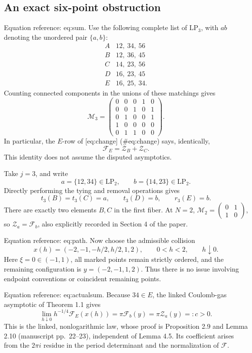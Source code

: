 \documentclass[10pt]{article}
\begin{document}
\subsection*{An exact six-point obstruction}
Equation reference: eq:sum. Use the following complete list of \(\mathrm{LP}_3\), with \(ab\) denoting the unordered pair \(\{a,b\}\): \[\begin{array}{c|l}
 A&12,\ 34,\ 56\\
 B&12,\ 36,\ 45\\
 C&14,\ 23,\ 56\\
 D&16,\ 23,\ 45\\
 E&16,\ 25,\ 34 .
\end{array}\] Counting connected components in the unions of these matchings gives \[\mathcal M_3=
 \begin{pmatrix}
 0&0&0&1&0\\
 0&0&1&0&1\\
 0&1&0&0&1\\
 1&0&0&0&0\\
 0&1&1&0&0
 \end{pmatrix}.\] In particular, the \(E\)-row of [eq:change] (\#eq:change) says, identically, \[
 \mathcal F_E=\mathcal Z_B+\mathcal Z_C.\] This identity does not assume the disputed asymptotics.\par
Take \(j=3\), and write \[a=\{12,34\}\in\mathrm{LP}_2,\qquad b=\{14,23\}\in\mathrm{LP}_2.\] Directly performing the tying and removal operations gives \[t_3(B)=t_3(C)=a,\qquad t_3(D)=b,\qquad r_3(E)=b .\] There are exactly two elements \(B,C\) in the first fiber. At \(N=2\), \(\mathcal M_2=\left(\begin{smallmatrix}0&1\\1&0\end{smallmatrix}\right)\), so \(\mathcal Z_a=\mathcal F_b\), also explicitly recorded in Section 4 of the paper.\par
Equation reference: eq:path. Now choose the admissible collision \[
 x(h)=(-2,-1,-h/2,h/2,1,2),\qquad 0<h<2,\qquad h\downarrow0.\] Here \(\xi=0\in(-1,1)\), all marked points remain strictly ordered, and the remaining configuration is \(y=(-2,-1,1,2)\). Thus there is no issue involving endpoint conventions or coincident remaining points.\par
Equation reference: eq:actualsum. Because \(34\in E\), the linked Coulomb-gas asymptotic of Theorem 1.1 gives \[
 \lim_{h\downarrow0}h^{-1/4}\mathcal F_E(x(h))
   =\pi\mathcal F_b(y)=\pi\mathcal Z_a(y)=:c>0.\] This is the linked, nonlogarithmic law, whose proof is Proposition 2.9 and Lemma 2.10 (manuscript pp. 22–23), independent of Lemma 4.5. Its coefficient arises from the \(2\pi i\) residue in the period determinant and the normalization of \(\mathcal F\).\par
\end{document}
